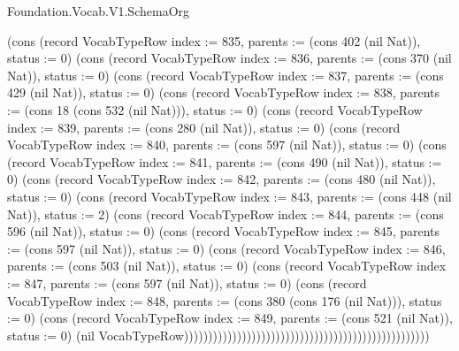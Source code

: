 \begin{lexlean}{Foundation.Vocab.V1.SchemaOrg}
\begin{semanticmodule}
{(cons (record VocabTypeRow {index := 835, parents := (cons 402 (nil Nat)), status := 0}) (cons (record VocabTypeRow {index := 836, parents := (cons 370 (nil Nat)), status := 0}) (cons (record VocabTypeRow {index := 837, parents := (cons 429 (nil Nat)), status := 0}) (cons (record VocabTypeRow {index := 838, parents := (cons 18 (cons 532 (nil Nat))), status := 0}) (cons (record VocabTypeRow {index := 839, parents := (cons 280 (nil Nat)), status := 0}) (cons (record VocabTypeRow {index := 840, parents := (cons 597 (nil Nat)), status := 0}) (cons (record VocabTypeRow {index := 841, parents := (cons 490 (nil Nat)), status := 0}) (cons (record VocabTypeRow {index := 842, parents := (cons 480 (nil Nat)), status := 0}) (cons (record VocabTypeRow {index := 843, parents := (cons 448 (nil Nat)), status := 2}) (cons (record VocabTypeRow {index := 844, parents := (cons 596 (nil Nat)), status := 0}) (cons (record VocabTypeRow {index := 845, parents := (cons 597 (nil Nat)), status := 0}) (cons (record VocabTypeRow {index := 846, parents := (cons 503 (nil Nat)), status := 0}) (cons (record VocabTypeRow {index := 847, parents := (cons 597 (nil Nat)), status := 0}) (cons (record VocabTypeRow {index := 848, parents := (cons 380 (cons 176 (nil Nat))), status := 0}) (cons (record VocabTypeRow {index := 849, parents := (cons 521 (nil Nat)), status := 0}) (nil VocabTypeRow)))))))))))))))))))))))))))))))))))))))))))))))))))
}


\end{semanticmodule}
\end{lexlean}
